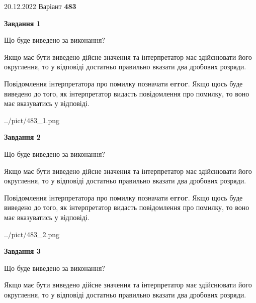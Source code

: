 \documentclass[12pt, ukrainian]{article}
\begin{document}
{20.12.2022 Варіант \No \textbf { 483 }\par}
{
\begin {Large}

{\begin {center}\textbf{Завдання 1}\end {center}}\par
Що буде виведено за виконання? \par

Якщо має бути виведено дійсне значення та інтерпретатор має здійснювати його округлення, 
то у відповіді достатньо правильно вказати два дробових розряди.

Повідомлення інтерпретатора про помилку позначати \textbf{error}.
Якщо щось буде виведено до того, як інтерпретатор видасть повідомлення про помилку, 
то воно має вказуватись у відповіді. \par

\begin{center}
	{../pict/483_1.png}
\end{center}
\newpage

{\begin {center}\textbf{Завдання 2}\end {center}}\par
Що буде виведено за виконання? \par

Якщо має бути виведено дійсне значення та інтерпретатор має здійснювати його округлення, 
то у відповіді достатньо правильно вказати два дробових розряди.

Повідомлення інтерпретатора про помилку позначати \textbf{error}.
Якщо щось буде виведено до того, як інтерпретатор видасть повідомлення про помилку, 
то воно має вказуватись у відповіді. \par

\begin{center}
	{../pict/483_2.png}
\end{center}
\newpage

{\begin {center}\textbf{Завдання 3}\end {center}}\par
Що буде виведено за виконання? \par

Якщо має бути виведено дійсне значення та інтерпретатор має здійснювати його округлення, 
то у відповіді достатньо правильно вказати два дробових розряди.


\end{Large}}
\end{document}
